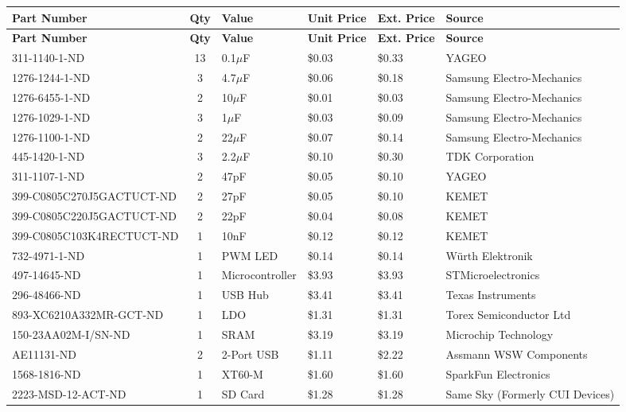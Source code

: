 \documentclass[../main.tex]{subfiles}
\begin{document}
\small
\setlength{\tabcolsep}{2pt}

\begin{longtable}{|p{5cm}|c|p{3cm}|p{1.3cm}|p{1.3cm}|p{5cm}|}
\hline
\textbf{Part Number} & \textbf{Qty} & \textbf{Value} & \textbf{Unit Price} & \textbf{Ext. Price} & \textbf{Source} \\
\hline
\endfirsthead
\hline
\textbf{Part Number} & \textbf{Qty} & \textbf{Value} & \textbf{Unit Price} & \textbf{Ext. Price} & \textbf{Source} \\
\hline
\endhead

311-1140-1-ND & 13 & 0.1$\mu$F & \$0.03 & \$0.33 & YAGEO \\
1276-1244-1-ND & 3 & 4.7$\mu$F & \$0.06 & \$0.18 & Samsung Electro-Mechanics \\
1276-6455-1-ND & 2 & 10$\mu$F & \$0.01 & \$0.03 & Samsung Electro-Mechanics \\
1276-1029-1-ND & 3 & 1$\mu$F & \$0.03 & \$0.09 & Samsung Electro-Mechanics \\
1276-1100-1-ND & 2 & 22$\mu$F & \$0.07 & \$0.14 & Samsung Electro-Mechanics \\
445-1420-1-ND & 3 & 2.2$\mu$F & \$0.10 & \$0.30 & TDK Corporation \\
311-1107-1-ND & 2 & 47pF & \$0.05 & \$0.10 & YAGEO \\
399-C0805C270J5GACTUCT-ND & 2 & 27pF & \$0.05 & \$0.10 & KEMET \\
399-C0805C220J5GACTUCT-ND & 2 & 22pF & \$0.04 & \$0.08 & KEMET \\
399-C0805C103K4RECTUCT-ND & 1 & 10nF & \$0.12 & \$0.12 & KEMET \\
732-4971-1-ND & 1 & PWM LED & \$0.14 & \$0.14 & Würth Elektronik \\
497-14645-ND & 1 & Microcontroller & \$3.93 & \$3.93 & STMicroelectronics \\
296-48466-ND & 1 & USB Hub & \$3.41 & \$3.41 & Texas Instruments \\
893-XC6210A332MR-GCT-ND & 1 & LDO & \$1.31 & \$1.31 & Torex Semiconductor Ltd \\
150-23AA02M-I/SN-ND & 1 & SRAM & \$3.19 & \$3.19 & Microchip Technology \\
AE11131-ND & 2 & 2-Port USB & \$1.11 & \$2.22 & Assmann WSW Components \\
1568-1816-ND & 1 & XT60-M & \$1.60 & \$1.60 & SparkFun Electronics \\
2223-MSD-12-ACT-ND & 1 & SD Card & \$1.28 & \$1.28 & Same Sky (Formerly CUI Devices) \\

\end{longtable}
\end{document}
